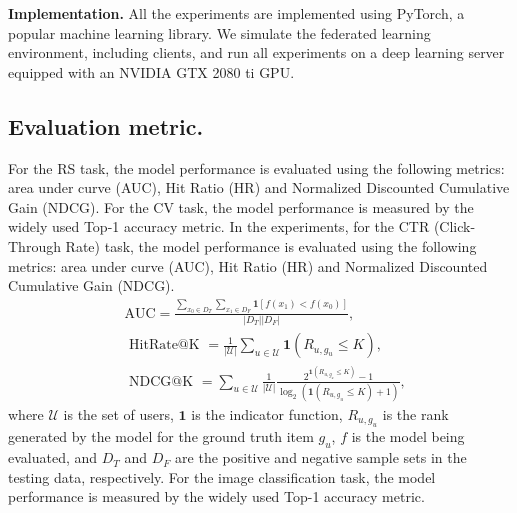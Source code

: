 \textbf{Implementation.} \label{implement}
All the experiments are implemented using PyTorch, a popular machine learning library. We simulate the federated learning environment, including clients, and run all experiments on a deep learning server equipped with an NVIDIA GTX 2080 ti GPU. 
\subsection{Evaluation metric.}
For the RS task, the model performance is evaluated using the following metrics: area under curve (AUC), Hit Ratio (HR) and Normalized Discounted Cumulative Gain (NDCG). 
For the CV task, the model performance is measured by the widely used Top-1 accuracy metric. 
In the experiments, for the CTR (Click-Through Rate) task, the model performance is evaluated using the following metrics: area under curve (AUC), Hit Ratio (HR) and Normalized Discounted Cumulative Gain (NDCG).
\begin{equation*}
  \begin{aligned}
  &\mathrm{AUC}=\frac{\sum_{x_{0} \in D_{T}} \sum_{x_{1} \in D_{F}} \mathbf{1}\left[f\left(x_{1}\right)<f\left(x_{0}\right)\right]}{\left|D_{T}\right|\left|D_{F}\right|},\\
  &\text { HitRate@K }=\frac{1}{|\mathcal{U}|} \sum_{u \in \mathcal{U}} \mathbf{1}\left(R_{u, g_{u}} \leq K\right), \\
  &\text { NDCG@K }=\sum_{u \in \mathcal{U}} \frac{1}{|\mathcal{U}|} \frac{2^{\mathbf{1}\left(R_{u, g_{u}} \leq K\right)}-1}{\log _{2}\left(\mathbf{1}\left(R_{u, g_{u}} \leq K\right)+1\right)},
  \end{aligned}
\end{equation*}
where $\mathcal{U}$ is the set of users, $\mathbf{1}$ is the indicator function, $R_{u, g_{u}}$ is the rank generated by the model for the ground truth item $g_{u}$, $f$ is the model being evaluated, and $D_{T}$ and $D_{F}$ are the positive and negative sample sets in the testing data, respectively.
For the image classification task, the model performance is measured by the widely used Top-1 accuracy metric. 

